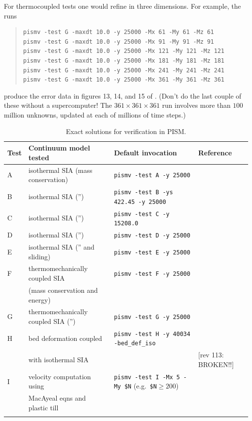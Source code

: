 \documentclass[11pt,final]{amsart}
\begin{document}
For thermocoupled tests one would refine in three dimensions.  For example, the runs
\begin{quote}\small\begin{verbatim}
pismv -test G -maxdt 10.0 -y 25000 -Mx 61 -My 61 -Mz 61
pismv -test G -maxdt 10.0 -y 25000 -Mx 91 -My 91 -Mz 91
pismv -test G -maxdt 10.0 -y 25000 -Mx 121 -My 121 -Mz 121
pismv -test G -maxdt 10.0 -y 25000 -Mx 181 -My 181 -Mz 181
pismv -test G -maxdt 10.0 -y 25000 -Mx 241 -My 241 -Mz 241
pismv -test G -maxdt 10.0 -y 25000 -Mx 361 -My 361 -Mz 361
\end{verbatim}
\normalsize\end{quote}
produce the error data in figures 13, 14, and 15 of \cite{BBL}.  (Don't do the last couple of these without a supercomputer!  The $361\times 361\times 361$ run involves more than $100$ million unknowns, updated at each of millions of time steps.)

\begin{table}[h]
\caption{Exact solutions for verification in PISM.}\label{tab:tests}
\small
\begin{tabular}{@{}llll}\hline
\textbf{Test} & \textbf{Continuum model tested} & \textbf{Default invocation} & \textbf{Reference} \\ \hline
A & isothermal SIA (mass conservation) & \verb|pismv -test A -y 25000| & \cite{BLKCB} \\
B & isothermal SIA ('') & \verb|pismv -test B -ys 422.45 -y 25000| & \cite{BLKCB} \\
C & isothermal SIA ('') & \verb|pismv -test C -y 15208.0| & \cite{BLKCB} \\
D & isothermal SIA ('') & \verb|pismv -test D -y 25000| & \cite{BLKCB} \\
E & isothermal SIA ('' and sliding) & \verb|pismv -test E -y 25000| & \cite{BLKCB} \\
F & thermomechanically coupled SIA  & \verb|pismv -test F -y 25000| & \cite{BBL,BB} \\
 & \quad (mass conservation and energy) & & \\
G & thermomechanically coupled SIA ('') & \verb|pismv -test G -y 25000| & \cite{BBL,BB} \\
H & bed deformation coupled & \verb|pismv -test H -y 40034 -bed_def_iso| & \cite{BLKfastearth} \\
 & \quad with isothermal SIA & & [rev 113: BROKEN!!] \\
I & velocity computation using & \verb|pismv -test I -Mx 5 -My $N| \quad (e.g.~\verb|$N|$\ge 200$) & \cite{MacAyeal,SchoofStream} \\
 & \quad MacAyeal eqns and plastic till & & \\
\hline
\normalsize
\end{tabular}
\end{table}
\end{document}
